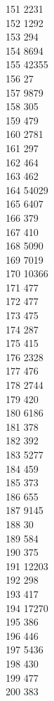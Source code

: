 { 151	2231 \\
 152	1292 \\
 153	294 \\
 154	8694 \\
 155	42355 \\
 156	27 \\
 157	9879 \\
 158	305 \\
 159	479 \\
 160	2781 \\
 161	297 \\
 162	464 \\
 163	462 \\
 164	54029 \\
 165	6407 \\
 166	379 \\
 167	410 \\
 168	5090 \\
 169	7019 \\
 170	10366 \\
 171	477 \\
 172	477 \\
 173	475 \\
 174	287 \\
 175	415 \\
 176	2328 \\
 177	476 \\
 178	2744 \\
 179	420 \\
 180	6186 \\
 181	378 \\
 182	392 \\
 183	5277 \\
 184	459 \\
 185	373 \\
 186	655 \\
 187	9145 \\
 188	30 \\
 189	584 \\
 190	375 \\
 191	12203 \\
 192	298 \\
 193	417 \\
 194	17270 \\
 195	386 \\
 196	446 \\
 197	5436 \\
 198	430 \\
 199	477 \\
 200	383 \\
}
